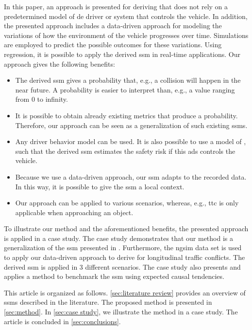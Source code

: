 In this paper, an approach is presented for deriving  that does not rely on a predetermined model of de driver or system that controls the vehicle. 
In addition, the presented approach includes a data-driven approach for modeling the variations of how the environment of the vehicle progresses over time.
Simulations are employed to predict the possible outcomes for these variations.
Using regression, it is possible to apply the derived \ac{ssm} in real-time applications.
Our approach gives the following benefits:
\begin{itemize}
	\item The derived \ac{ssm} gives a probability that, e.g., a collision will happen in the near future. 
	A probability is easier to interpret than, e.g., a value ranging from 0 to infinity.
	
	\item It is possible to obtain already existing metrics that produce a probability. 
	Therefore, our approach can be seen as a generalization of such existing \acp{ssm}.
	
	\item Any driver behavior model can be used.
	It is also possible to use a model of , such that the derived \ac{ssm} estimates the safety risk if this \ac{ads} controls the vehicle.
	
	\item Because we use a data-driven approach, our \ac{ssm} adapts to the recorded data. 
	In this way, it is possible to give the \ac{ssm} a local context.
	
	\item Our approach can be applied to various scenarios, whereas, e.g., \ac{ttc} is only applicable when approaching an object.
\end{itemize}

To illustrate our method and the aforementioned benefits, the presented approach is applied in a case study.
The case study demonstrates that our method is a generalization of the \ac{ssm} presented in \autocite{wang2014evaluation}.
Furthermore, the \ac{ngsim} data set \autocite{kovvali2007video} is used to apply our data-driven approach to derive  for longitudinal traffic conflicts.
The derived \ac{ssm} is applied in 3 different scenarios.
The case study also presents and applies a method to benchmark the \ac{ssm} using expected causal tendencies.

This article is organized as follows.
\cref{sec:literature review} provides an overview of \acp{ssm} described in the literature.
The proposed method is presented in \cref{sec:method}.
In \cref{sec:case study}, we illustrate the method in a case study.
The article is concluded in \cref{sec:conclusions}.
